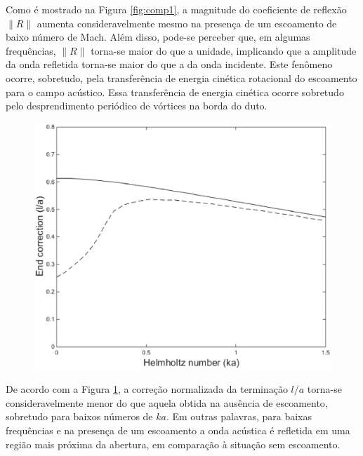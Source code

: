 Como é mostrado na Figura \ref{fig:comp1}, a magnitude do coeficiente de reflexão $\|R\|$ aumenta consideravelmente mesmo na presença de um escoamento de baixo número de Mach. Além disso, pode-se perceber que, em algumas frequências, $\|R\|$ torna-se maior do que a unidade, implicando que a amplitude da onda refletida torna-se maior do que a da onda incidente. Este fenômeno ocorre, sobretudo, pela transferência de energia cinética rotacional do escoamento para o campo acústico. Essa transferência de energia cinética ocorre sobretudo pelo desprendimento periódico de vórtices na borda do duto.

\begin{figure}[ht!]
\centering
  \includegraphics[width=.9\linewidth]{figuras/loa_comparacao.eps}
  \label{fig:comp2}
\end{figure}

De acordo com a Figura \ref{fig:comp2}, a correção normalizada da terminação $l/a$ torna-se consideravelmente menor do que aquela obtida na ausência de escoamento, sobretudo para baixos números de $ka$. Em outras palavras, para baixas frequências e na presença de um escoamento a onda acústica é refletida em uma região mais próxima da abertura, em comparação à situação sem escoamento.


